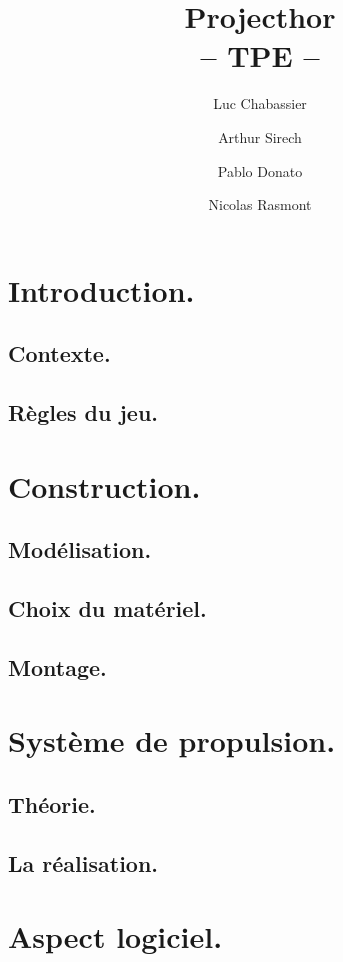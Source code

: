 \documentclass{report}
\title{Projecthor\\-- TPE --}
\author{Luc Chabassier \and Arthur Sirech \and Pablo Donato \and Nicolas Rasmont}
\begin{document}
\maketitle

\tableofcontents

\part{Introduction.}
\chapter{Contexte.}


\chapter{Règles du jeu.}


\part{Construction.}
\chapter{Modélisation.}
% 

\chapter{Choix du matériel.} %
% 
% 

\chapter{Montage.}
% 

\part{Système de propulsion.}
\chapter{Théorie.}
% 

\chapter{La réalisation.}
% 

\part{Aspect logiciel.}
\end{document}
